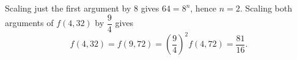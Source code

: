 Scaling just the first argument by $8$ gives $64=8^n$, hence $n=2$. Scaling both arguments of $f(4,32)$ by $\dfrac{9}{4}$ gives
\[
f(4,32)=f(9,72)=\left(\dfrac{9}{4}\right)^2f(4,72)=\boxed{\dfrac{81}{16}}.
\]
